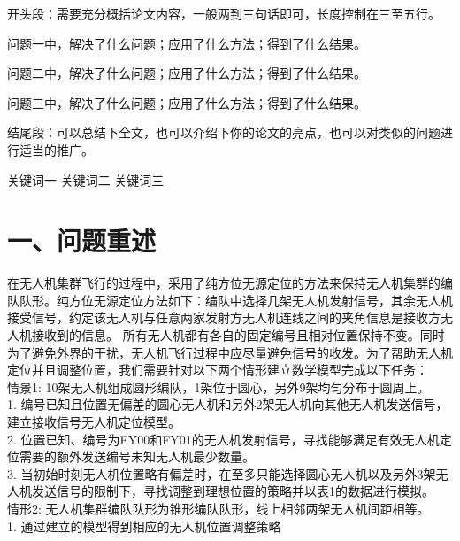 \documentclass{my_paper}
\begin{document}
\newpage

\begin{center}
\lunwenbiaoti

\vspace{2ex}
\zhaiyao
\end{center}

开头段：需要充分概括论文内容，一般两到三句话即可，长度控制在三至五行。

问题一中，解决了什么问题；应用了什么方法；得到了什么结果。

问题二中，解决了什么问题；应用了什么方法；得到了什么结果。

问题三中，解决了什么问题；应用了什么方法；得到了什么结果。

结尾段：可以总结下全文，也可以介绍下你的论文的亮点，也可以对类似的问题进行适当的推广。

\begin{guanjianci}
关键词一 \quad 关键词二 \quad 关键词三
\end{guanjianci}

\newpage
\section{一、问题重述}
在无人机集群飞行的过程中，采用了纯方位无源定位的方法来保持无人机集群的编队队形。纯方位无源定位方法如下：编队中选择几架无人机发射信号，其余无人机接受信号，约定该无人机与任意两家发射方无人机连线之间的夹角信息是接收方无人机接收到的信息。
所有无人机都有各自的固定编号且相对位置保持不变。同时为了避免外界的干扰，无人机飞行过程中应尽量避免信号的收发。为了帮助无人机定位并且调整位置，我们需要针对以下两个情形建立数学模型完成以下任务：\\
情景1: 10架无人机组成圆形编队，1架位于圆心，另外9架均匀分布于圆周上。  \\
1. 编号已知且位置无偏差的圆心无人机和另外2架无人机向其他无人机发送信号，建立接收信号无人机定位模型。 \\
2. 位置已知、编号为FY00和FY01的无人机发射信号，寻找能够满足有效无人机定位需要的额外发送编号未知无人机最少数量。 \\
3. 当初始时刻无人机位置略有偏差时，在至多只能选择圆心无人机以及另外3架无人机发送信号的限制下，寻找调整到理想位置的策略并以表1的数据进行模拟。 \\
情形2: 无人机集群编队队形为锥形编队队形，线上相邻两架无人机间距相等。 \\
1. 通过建立的模型得到相应的无人机位置调整策略
\end{document}
